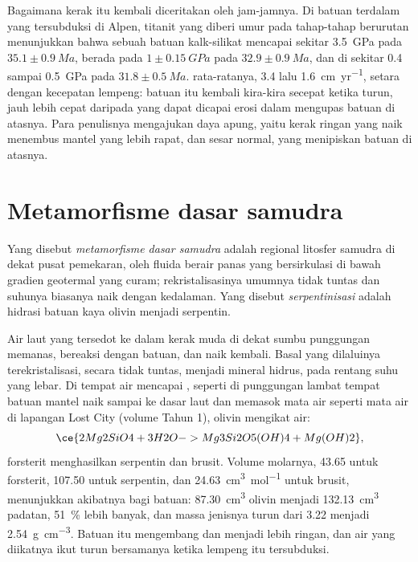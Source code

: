 Bagaimana kerak itu kembali diceritakan oleh jam-jamnya. Di batuan terdalam yang tersubduksi di Alpen,
titanit yang diberi umur pada tahap-tahap berurutan menunjukkan bahwa sebuah batuan kalk-silikat mencapai sekitar
\qty{3.5}{GPa} pada $35.1 \pm \qty{0.9}{Ma}$, berada pada $1 \pm \qty{0.15}{GPa}$ pada $32.9 \pm
\qty{0.9}{Ma}$, dan di sekitar 0.4 sampai \qty{0.5}{GPa} pada $31.8 \pm \qty{0.5}{Ma}$.  rata-ratanya, 3.4 lalu \qty{1.6}{cm.yr^{-1}}, setara dengan kecepatan lempeng: batuan itu
kembali kira-kira secepat ketika turun, jauh lebih cepat daripada yang dapat dicapai erosi dalam mengupas
batuan di atasnya. Para penulisnya mengajukan daya apung, yaitu kerak ringan yang naik menembus mantel yang lebih rapat, dan
sesar normal, yang menipiskan batuan di atasnya.

\section{Metamorfisme dasar samudra}\label{sec:b2:pt-paths:ocean-floor}

\begin{definition}\label{def:b2:pt-paths:ocean-floor}
Yang disebut \emph{metamorfisme dasar samudra} adalah
 regional litosfer samudra di dekat pusat pemekaran, oleh fluida berair panas
yang bersirkulasi di bawah gradien geotermal yang curam; rekristalisasinya umumnya tidak tuntas
dan suhunya biasanya naik dengan kedalaman. Yang disebut \emph{serpentinisasi}
adalah hidrasi batuan kaya olivin menjadi serpentin.
\end{definition}

Air laut yang tersedot ke dalam kerak muda di dekat sumbu punggungan memanas, bereaksi dengan batuan, dan
naik kembali. Basal yang dilaluinya terekristalisasi, secara tidak tuntas, menjadi mineral
hidrus, pada rentang suhu yang lebar. Di tempat air mencapai , seperti di
punggungan lambat tempat batuan mantel naik sampai ke dasar laut dan memasok mata air seperti
mata air di lapangan Lost City (volume Tahun 1), olivin mengikat air:
\[
\ce{2 Mg2SiO4 + 3 H2O -> Mg3Si2O5(OH)4 + Mg(OH)2},
\]
forsterit menghasilkan serpentin dan brusit. Volume molarnya, 43.65 untuk forsterit, 107.50
untuk serpentin, dan \qty{24.63}{cm^3.mol^{-1}} untuk brusit, menunjukkan akibatnya bagi batuan:
\qty{87.30}{cm^3} olivin menjadi \qty{132.13}{cm^3} padatan, \qty{51}{\percent}
lebih banyak, dan massa jenisnya turun dari 3.22 menjadi \qty{2.54}{g.cm^{-3}}. Batuan itu mengembang dan
menjadi lebih ringan, dan air yang diikatnya ikut turun bersamanya ketika lempeng itu tersubduksi.

